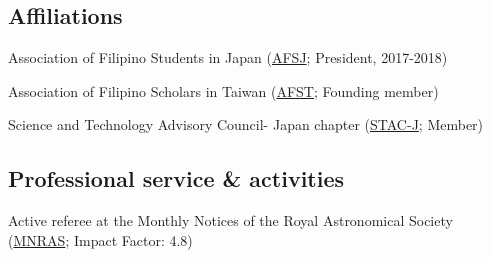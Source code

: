 \documentclass[12pt,letterpaper]{article}
\begin{document}
\subsection{Affiliations}
\begin{list}{}{\cvlist}
    \item Association of Filipino Students in Japan (\href{https://www.facebook.com/afsjpage/}{AFSJ}; President, 2017-2018)
    \item Association of Filipino Scholars in Taiwan  (\href{https://www.facebook.com/AssocIskolar/}{AFST}; Founding member)
    \item Science and Technology Advisory Council- Japan chapter (\href{https://www.facebook.com/profile.php?id=100083271798519}{STAC-J}; Member)
\end{list}

\subsection{Professional service \& activities}
\begin{list}{}{\cvlist}
  \item Active referee at the Monthly Notices of the Royal Astronomical Society (\href{https://academic.oup.com/mnras}{MNRAS}; Impact Factor: 4.8)
\end{list}
\end{document}
